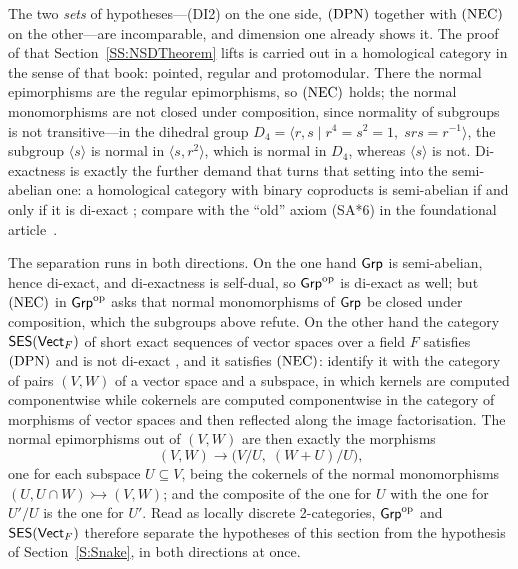 \begin{remark}
  \label{Rem NSD Discrete}
  The two \emph{sets} of hypotheses---\textup{(DI2)} on the one side, \(\textup{(DPN)}\) together with \(\textup{(NEC)}\) on the other---are incomparable, and dimension one already shows it. The proof of \cite{Borceux-Bourn} that Section~\ref{SS:NSDTheorem} lifts is carried out in a homological category in the sense of that book: pointed, regular and protomodular. There the normal epimorphisms are the regular epimorphisms, so \(\textup{(NEC)}\) holds; the normal monomorphisms are not closed under composition, since normality of subgroups is not transitive---in the dihedral group \(D_{4}=\langle r,s\mid r^{4}=s^{2}=1,\;srs=r^{-1}\rangle\), the subgroup \(\langle s\rangle\) is normal in \(\langle s,r^{2}\rangle\), which is normal in \(D_{4}\), whereas \(\langle s\rangle\) is not. Di-exactness is exactly the further demand that turns that setting into the semi-abelian one: a homological category with binary coproducts is semi-abelian if and only if it is di-exact \cite[Theorem~5.7.3 with Definition~5.1.1]{PVdL3}; compare with the ``old'' axiom (SA*6) in the foundational article~\cite{Janelidze-Marki-Tholen}.

	The separation runs in both directions. On the one hand \(\mathsf{Grp}\) is semi-abelian, hence di-exact, and di-exactness is self-dual, so \(\mathsf{Grp}^{\operatorname{op}}\) is di-exact as well; but \(\textup{(NEC)}\) in \(\mathsf{Grp}^{\operatorname{op}}\) asks that normal monomorphisms of \(\mathsf{Grp}\) be closed under composition, which the subgroups above refute. On the other hand the category \(\mathsf{SES}(\mathsf{Vect}_{F})\) of short exact sequences of vector spaces over a field \(F\) satisfies \(\textup{(DPN)}\) and is not di-exact \cite[Example~4.3.8]{Afsa-24}, and it satisfies \(\textup{(NEC)}\): identify it with the category of pairs \((V,W)\) of a vector space and a subspace, in which kernels are computed componentwise while cokernels are computed componentwise in the category of morphisms of vector spaces and then reflected along the image factorisation. The normal epimorphisms out of \((V,W)\) are then exactly the morphisms
	\[
		(V,W)\longrightarrow\bigl(V/U,\;(W+U)/U\bigr)\text{,}
	\]
	one for each subspace \(U\subseteq V\), being the cokernels of the normal monomorphisms \((U,U\cap W)\rightarrowtail(V,W)\); and the composite of the one for \(U\) with the one for \(U'/U\) is the one for \(U'\). Read as locally discrete 2-categories, \(\mathsf{Grp}^{\operatorname{op}}\) and \(\mathsf{SES}(\mathsf{Vect}_{F})\) therefore separate the hypotheses of this section from the hypothesis of Section~\ref{S:Snake}, in both directions at once.
\end{remark}

